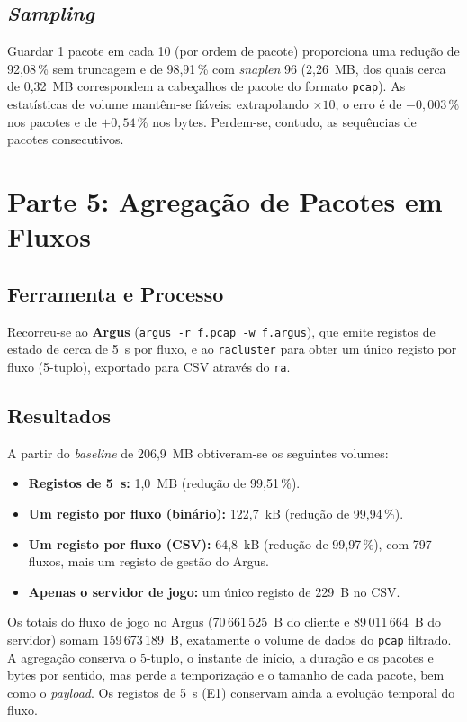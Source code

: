 \documentclass[11pt, a4paper]{article}
\begin{document}
\subsection{\textit{Sampling}}
Guardar 1 pacote em cada 10 (por ordem de pacote) proporciona uma redução de 92,08\,\% sem truncagem e de 98,91\,\% com \textit{snaplen} 96 (2,26~MB, dos quais cerca de 0,32~MB correspondem a cabeçalhos de pacote do formato \texttt{pcap}). As estatísticas de volume mantêm-se fiáveis: extrapolando $\times 10$, o erro é de $-0{,}003\,\%$ nos pacotes e de $+0{,}54\,\%$ nos bytes. Perdem-se, contudo, as sequências de pacotes consecutivos.

\section{Parte 5: Agregação de Pacotes em Fluxos}

\subsection{Ferramenta e Processo}
Recorreu-se ao \textbf{Argus} (\texttt{argus -r f.pcap -w f.argus}), que emite registos de estado de cerca de 5~s por fluxo, e ao \texttt{racluster} para obter um único registo por fluxo (5-tuplo), exportado para CSV através do \texttt{ra}.

\subsection{Resultados}
A partir do \textit{baseline} de 206,9~MB obtiveram-se os seguintes volumes:
\begin{itemize}
    \item \textbf{Registos de 5~s:} 1,0~MB (redução de 99,51\,\%).
    \item \textbf{Um registo por fluxo (binário):} 122,7~kB (redução de 99,94\,\%).
    \item \textbf{Um registo por fluxo (CSV):} 64,8~kB (redução de 99,97\,\%), com 797 fluxos, mais um registo de gestão do Argus.
    \item \textbf{Apenas o servidor de jogo:} um único registo de 229~B no CSV.
\end{itemize}

Os totais do fluxo de jogo no Argus (70\,661\,525~B do cliente e 89\,011\,664~B do servidor) somam 159\,673\,189~B, exatamente o volume de dados do \texttt{pcap} filtrado. A agregação conserva o 5-tuplo, o instante de início, a duração e os pacotes e bytes por sentido, mas perde a temporização e o tamanho de cada pacote, bem como o \textit{payload}. Os registos de 5~s (E1) conservam ainda a evolução temporal do fluxo.
\end{document}
